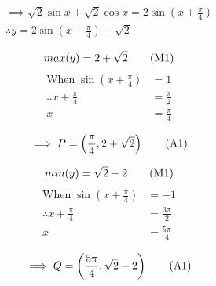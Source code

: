 \begin{gather*} %
    \displaystyle \implies\sqrt{2}\sin{x} + \sqrt{2}\cos{x} = 2\sin{\left(x + \frac{\pi}{4}\right)}\\
    \displaystyle \therefore y = 2\sin{\left(x + \frac{\pi}{4}\right)} + \sqrt{2}
\end{gather*}
\begin{multicols}{2}
    \begin{equation*}
        max(y) = 2 + \sqrt{2} \wrkonemark
    \end{equation*}
    \begin{align*} %
        \text{When} \; \sin{\left(x + \frac{\pi}{4}\right)} &= 1 \\
        \therefore x + \frac{\pi}{4} &= \frac{\pi}{2}\\
        x &= \frac{\pi}{4}
    \end{align*}

    \begin{equation*}
        \implies P = \left(\frac{\pi}{4} , 2 + \sqrt{2}\right) \ansonemark
    \end{equation*}

    \begin{equation*}
        min(y) = \sqrt{2} - 2 \wrkonemark
    \end{equation*}
    \begin{align*} %
        \text{When} \; \sin{\left(x + \frac{\pi}{4}\right)} &= -1\\
        \therefore x + \frac{\pi}{4} &= \frac{3\pi}{2}\\
        x &= \frac{5\pi}{4}
    \end{align*}

    \begin{equation*}
        \implies Q = \left(\frac{5\pi}{4} , \sqrt{2} - 2\right) \ansonemark
    \end{equation*}
\end{multicols}

